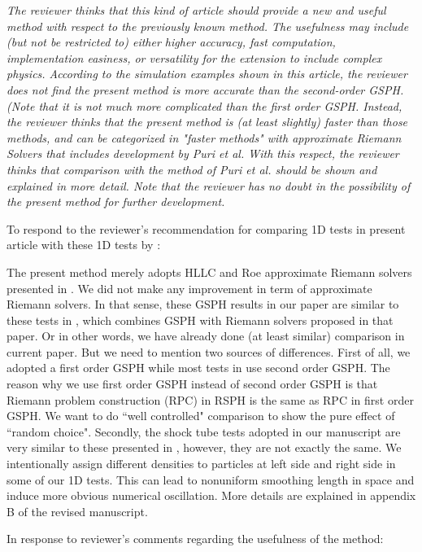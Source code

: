 \documentclass[10pt,a4paper]{article}
\begin{document}
\textit{The reviewer thinks that this kind of article should provide a new and useful method with respect to the previously known method. The usefulness may include (but not be restricted to) either higher accuracy, fast computation, implementation easiness, or versatility for the extension to include complex physics. According to the simulation examples shown in this article, the reviewer does not find the present method is more accurate than the second-order GSPH. (Note that it is not much more complicated than the first order GSPH. Instead, the reviewer thinks that the present method is (at least slightly) faster than those methods, and can be categorized in "faster methods" with approximate Riemann Solvers that includes development by Puri et al. With this respect, the reviewer thinks that comparison with the method of Puri et al. should be shown and explained in more detail. Note that the reviewer has no doubt in the
possibility of the present method for further development.}

To respond to the reviewer's recommendation for comparing 1D tests in present article with these 1D tests by \citet{puri2014approximate}:

The present method merely adopts HLLC and Roe approximate Riemann solvers presented in \citep{puri2014approximate}. We did not make any improvement in term of approximate Riemann solvers. In that sense, these GSPH results in our paper are similar to these tests in \citep{puri2014approximate}, which combines GSPH with Riemann solvers proposed in that paper. Or in other words, we have already done (at least similar) comparison in current paper.
But we need to mention two sources of differences. First of all, we adopted a first order GSPH while most tests in \citep{puri2014approximate} use second order GSPH. The reason why we use first order GSPH instead of second order GSPH is that Riemann problem construction (RPC) in RSPH is the same as RPC in first order GSPH. We want to do ``well controlled" comparison to show the pure effect of ``random choice". Secondly, the shock tube tests adopted in our manuscript are very similar to these presented in \citep{puri2014approximate}, however, they are not exactly the same. We intentionally assign different densities to particles at left side and right side in some of our 1D tests. This can lead to nonuniform smoothing length in space and induce more obvious numerical oscillation. More details are explained in appendix B of the revised manuscript.

In response to reviewer's comments regarding the usefulness of the method:
\end{document}
